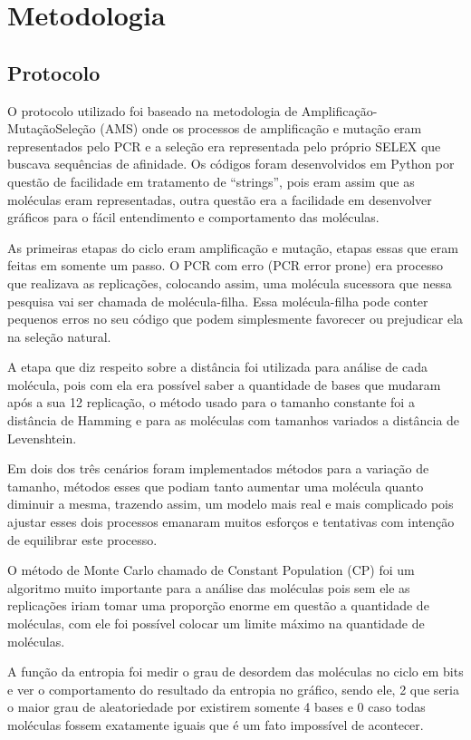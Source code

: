 \section{Metodologia}

\subsection{Protocolo}

O protocolo utilizado foi baseado na metodologia de Amplificação-MutaçãoSeleção (AMS) onde os processos de amplificação e mutação eram representados pelo PCR e a seleção era representada pelo próprio SELEX que buscava sequências de afinidade. Os códigos foram desenvolvidos em Python por questão de facilidade em
tratamento de “strings”, pois eram assim que as moléculas eram representadas, outra questão era a facilidade em desenvolver gráficos para o fácil entendimento e comportamento das moléculas.


As primeiras etapas do ciclo eram amplificação e mutação, etapas essas que eram
feitas em somente um passo. O PCR com erro (PCR error prone) era processo que
realizava as replicações, colocando assim, uma molécula sucessora que nessa pesquisa
vai ser chamada de molécula-filha. Essa molécula-filha pode conter pequenos erros no
seu código que podem simplesmente favorecer ou prejudicar ela na seleção natural.

A etapa que diz respeito sobre a distância foi utilizada para análise de cada
molécula, pois com ela era possível saber a quantidade de bases que mudaram após a sua 
12
replicação, o método usado para o tamanho constante foi a distância de Hamming e para
as moléculas com tamanhos variados a distância de Levenshtein.

Em dois dos três cenários foram implementados métodos para a variação de
tamanho, métodos esses que podiam tanto aumentar uma molécula quanto diminuir a
mesma, trazendo assim, um modelo mais real e mais complicado pois ajustar esses dois
processos emanaram muitos esforços e tentativas com intenção de equilibrar este
processo.

O método de Monte Carlo chamado de Constant Population (CP) foi um algoritmo
muito importante para a análise das moléculas pois sem ele as replicações iriam tomar
uma proporção enorme em questão a quantidade de moléculas, com ele foi possível
colocar um limite máximo na quantidade de moléculas.

A função da entropia foi medir o grau de desordem das moléculas no ciclo em bits
e ver o comportamento do resultado da entropia no gráfico, sendo ele, 2 que seria o maior
grau de aleatoriedade por existirem somente 4 bases e 0 caso todas moléculas fossem
exatamente iguais que é um fato impossível de acontecer.


